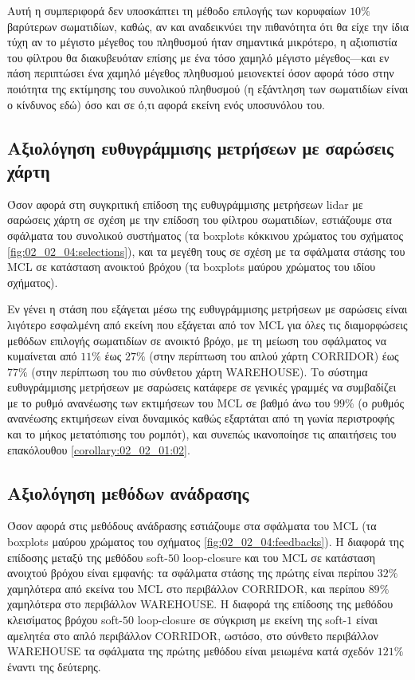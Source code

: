 Αυτή η συμπεριφορά δεν υποσκάπτει τη μέθοδο επιλογής των κορυφαίων $10\%$
βαρύτερων σωματιδίων, καθώς, αν και αναδεικνύει την πιθανότητα ότι θα είχε την
ίδια τύχη αν το μέγιστο μέγεθος του πληθυσμού ήταν σημαντικά μικρότερο, η
αξιοπιστία του φίλτρου θα διακυβευόταν επίσης με ένα τόσο χαμηλό μέγιστο
μέγεθος---και εν πάση περιπτώσει ένα χαμηλό μέγεθος πληθυσμού μειονεκτεί όσον
αφορά τόσο στην ποιότητα της εκτίμησης του συνολικού πληθυσμού (η εξάντληση των
σωματιδίων είναι ο κίνδυνος εδώ) όσο και σε ό,τι αφορά εκείνη ενός υποσυνόλου
του.


\subsection{Αξιολόγηση ευθυγράμμισης μετρήσεων με σαρώσεις χάρτη}
\label{subsection:02_02_04:04}

Όσον αφορά στη συγκριτική επίδοση της ευθυγράμμισης μετρήσεων lidar με σαρώσεις
χάρτη σε σχέση με την επίδοση του φίλτρου σωματιδίων, εστιάζουμε στα σφάλματα
του συνολικού συστήματος (τα boxplots κόκκινου χρώματος του σχήματος
\ref{fig:02_02_04:selections}), και τα μεγέθη τους σε σχέση με τα σφάλματα
στάσης του MCL σε κατάσταση ανοικτού βρόχου (τα boxplots μαύρου χρώματος του
ιδίου σχήματος).

Εν γένει η στάση που εξάγεται μέσω της ευθυγράμμισης μετρήσεων με σαρώσεις
είναι λιγότερο εσφαλμένη από εκείνη που εξάγεται από τον MCL για όλες τις
διαμορφώσεις μεθόδων επιλογής σωματιδίων σε ανοικτό βρόχο, με τη μείωση του
σφάλματος να κυμαίνεται από $11\%$ έως $27\%$ (στην περίπτωση του απλού χάρτη
CORRIDOR) έως $77\%$ (στην περίπτωση του πιο σύνθετου χάρτη
WAREHOUSE). Το σύστημα ευθυγράμμισης μετρήσεων με σαρώσεις κατάφερε σε γενικές
γραμμές να συμβαδίζει με το ρυθμό ανανέωσης των εκτιμήσεων του MCL σε
βαθμό άνω του $99\%$ (ο ρυθμός ανανέωσης εκτιμήσεων είναι δυναμικός καθώς
εξαρτάται από τη γωνία περιστροφής και το μήκος μετατόπισης του ρομπότ), και
συνεπώς ικανοποίησε τις απαιτήσεις του επακόλουθου \ref{corollary:02_02_01:02}.

\subsection{Αξιολόγηση μεθόδων ανάδρασης}
\label{subsection:02_02_04:05}

Όσον αφορά στις μεθόδους ανάδρασης εστιάζουμε στα σφάλματα του MCL (τα
boxplots μαύρου χρώματος του σχήματος \ref{fig:02_02_04:feedbacks}). Η διαφορά
της επίδοσης μεταξύ της μεθόδου soft-$50$ loop-closure και του MCL σε κατάσταση
ανοιχτού βρόχου είναι εμφανής: τα σφάλματα στάσης της πρώτης είναι περίπου
$32\%$ χαμηλότερα από εκείνα του MCL στο περιβάλλον CORRIDOR, και περίπου
$89\%$ χαμηλότερα στο περιβάλλον WAREHOUSE. Η διαφορά της επίδοσης της μεθόδου
κλεισίματος βρόχου soft-$50$ loop-closure σε σύγκριση με εκείνη της soft-$1$
είναι αμελητέα στο απλό περιβάλλον CORRIDOR, ωστόσο, στο σύνθετο περιβάλλον
WAREHOUSE τα σφάλματα της πρώτης μεθόδου είναι μειωμένα κατά σχεδόν $121\%$
έναντι της δεύτερης.

